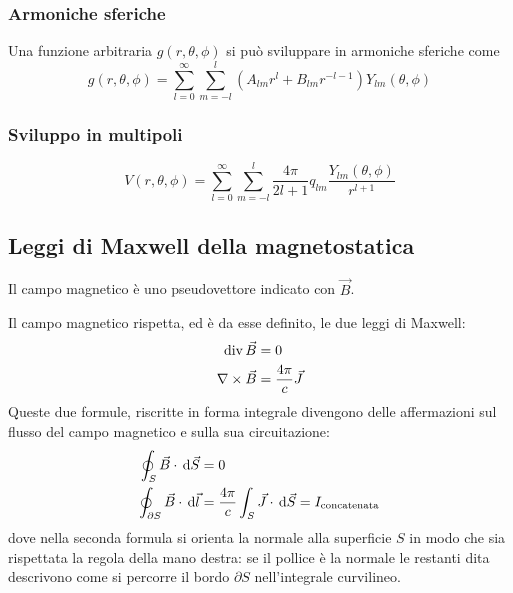 \documentclass[../main.tex]{subfiles}
\begin{document}
\subsubsection{Armoniche sferiche}
Una funzione arbitraria $g(r, \theta, \phi)$ si può sviluppare in armoniche sferiche come
\begin{equation}
  \label{Armoniche}
  g(r, \theta, \phi)= \sum_{l=0}^\infty \sum_{m=-l}^l (A_{lm}r^l+B_{lm}r^{-l-1}) Y_{lm}(\theta,\phi)
\end{equation}
\subsubsection{Sviluppo in multipoli}
\begin{equation}
  \label{Multipoli}
  V(r, \theta, \phi)=\sum_{l=0}^\infty \sum_{m=-l}^l \frac{4 \pi}{2l+1}q_{lm} \frac{Y_{lm}(\theta, \phi)}{r^{l+1}}
\end{equation}

\subsection{Leggi di Maxwell della magnetostatica}
Il campo magnetico è uno pseudovettore indicato con $\vec B$.

Il campo magnetico rispetta, ed è da esse definito, le due leggi di Maxwell:
\begin{align}
	\operatorname{div} \vec B &=0 \label{DivergenzaMagnetostatica} \\
	\nabla\times \vec B &=\frac{4\pi}c\vec J \label{LeggeAmpere}
\end{align}
Queste due formule, riscritte in forma integrale divengono delle affermazioni sul flusso del campo magnetico e sulla sua circuitazione:
\begin{align}
	\oint_S \vec B\cdot \,\mathrm d \vec S&=0 \label{NoMonopoliMagnetici} \\
	\oint_{\partial S} \vec B \cdot \,\mathrm d \vec l &= \frac{4\pi}c \int_S \vec J\cdot \,\mathrm d \vec S = I_{\text{concatenata}}\label{CircuitazioneMagnetico}
\end{align}
dove nella seconda formula si orienta la normale alla superficie $S$ in modo che sia rispettata la regola della mano destra: se il pollice è la normale le restanti dita descrivono come si percorre il bordo $\partial S$ nell'integrale curvilineo.
\end{document}
